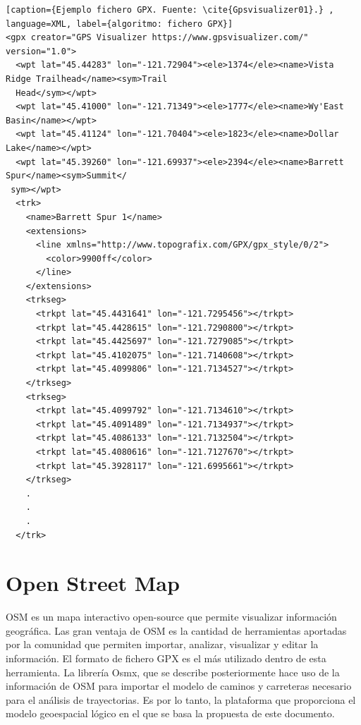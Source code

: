 \begin{lstlisting}[caption={Ejemplo fichero GPX. Fuente: \cite{Gpsvisualizer01}.} , language=XML, label={algoritmo: fichero GPX}]
<gpx creator="GPS Visualizer https://www.gpsvisualizer.com/" version="1.0">
  <wpt lat="45.44283" lon="-121.72904"><ele>1374</ele><name>Vista Ridge Trailhead</name><sym>Trail 
  Head</sym></wpt>
  <wpt lat="45.41000" lon="-121.71349"><ele>1777</ele><name>Wy'East Basin</name></wpt>
  <wpt lat="45.41124" lon="-121.70404"><ele>1823</ele><name>Dollar Lake</name></wpt>
  <wpt lat="45.39260" lon="-121.69937"><ele>2394</ele><name>Barrett Spur</name><sym>Summit</
 sym></wpt>
  <trk>
    <name>Barrett Spur 1</name>
    <extensions>
      <line xmlns="http://www.topografix.com/GPX/gpx_style/0/2">
        <color>9900ff</color>
      </line>
    </extensions>
    <trkseg>
      <trkpt lat="45.4431641" lon="-121.7295456"></trkpt>
      <trkpt lat="45.4428615" lon="-121.7290800"></trkpt>
      <trkpt lat="45.4425697" lon="-121.7279085"></trkpt>
      <trkpt lat="45.4102075" lon="-121.7140608"></trkpt>
      <trkpt lat="45.4099806" lon="-121.7134527"></trkpt>
    </trkseg>
    <trkseg>
      <trkpt lat="45.4099792" lon="-121.7134610"></trkpt>
      <trkpt lat="45.4091489" lon="-121.7134937"></trkpt>
      <trkpt lat="45.4086133" lon="-121.7132504"></trkpt>
      <trkpt lat="45.4080616" lon="-121.7127670"></trkpt>
      <trkpt lat="45.3928117" lon="-121.6995661"></trkpt>
    </trkseg>
    .
    .
    .
  </trk>

\end{lstlisting}

\section{Open Street Map}
\ac{OSM} es un mapa interactivo open-source que permite visualizar información geográfica. Las gran ventaja 
de \ac{OSM} es la cantidad de herramientas aportadas por la comunidad que permiten importar, analizar, 
visualizar y editar la información. El formato de fichero \ac{GPX} es el más utilizado dentro de esta 
herramienta. La librería Osmx, que se describe posteriormente hace uso de la información de \ac{OSM} para
importar el modelo de caminos y carreteras necesario para el análisis de trayectorias. Es por lo tanto, la 
plataforma que proporciona el modelo geoespacial lógico en el que se basa la propuesta de este documento.